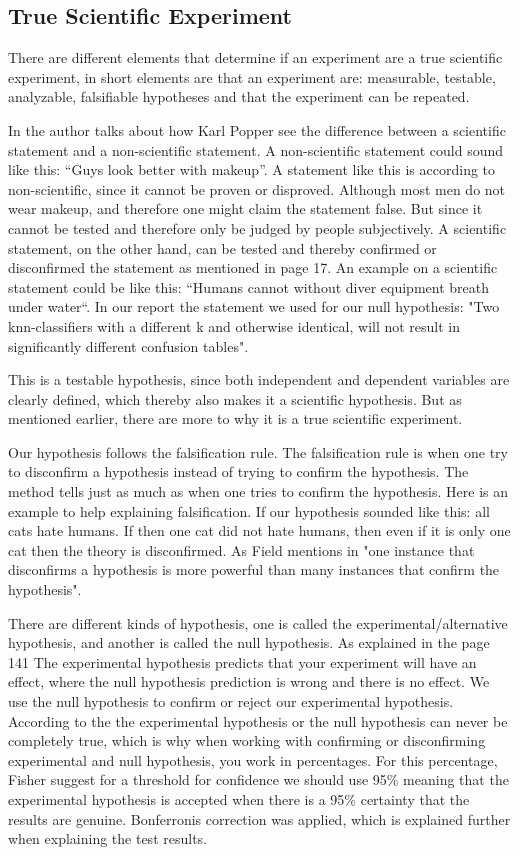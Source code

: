 \subsection{True Scientific Experiment}
There are different elements that determine if an experiment are a true scientific experiment, in short elements are that an experiment are: measurable, testable, analyzable, falsifiable hypotheses and that the experiment can be repeated.

In \citep{Design} the author talks about how Karl Popper see the difference between a scientific statement and a non-scientific statement. A non-scientific statement could sound like this: “Guys look better with makeup”. A statement like this is according to \citep{Design} non-scientific, since it cannot be proven or disproved. Although most men do not wear makeup, and therefore one might claim the statement false. But since it cannot be tested and therefore only be judged by people subjectively. 
A scientific statement, on the other hand, can be tested and thereby confirmed or disconfirmed the statement as mentioned in \citep{Design} page 17. An example on a scientific statement could be like this: “Humans cannot without diver equipment breath under water“.
In our report the statement we used for our null hypothesis: "Two knn-classifiers with a different k and otherwise identical, will not result in significantly different confusion tables". 

This is a testable hypothesis, since both independent and dependent variables are clearly defined, which thereby also makes it a scientific hypothesis. But as mentioned earlier, there are more to why it is a true scientific experiment. 


Our hypothesis follows the falsification rule.
The falsification rule is when one try to disconfirm a hypothesis instead of trying to confirm the hypothesis. The method tells just as much as when one tries to confirm the hypothesis. Here is an example to help explaining  falsification. If our hypothesis sounded like this: all cats hate humans. If then one cat did not hate humans, then even if it is only one cat then the theory is disconfirmed. As Field mentions in \citep{Design} "one instance that disconfirms a hypothesis is more powerful than many instances that confirm the hypothesis".

There are different kinds of hypothesis, one is called the experimental/alternative hypothesis, and another is called the null hypothesis. As explained in the \citep{Design} page 141 The experimental hypothesis predicts that your experiment will have an effect, where the null hypothesis prediction is wrong and there is no effect.
We use the null hypothesis to confirm or reject our experimental hypothesis. According to the \citep{Design} the experimental hypothesis or the null hypothesis can never be completely true, which is why when working with confirming or disconfirming experimental and null hypothesis, you work in percentages. For this percentage, Fisher suggest for a threshold for confidence we should use 95\% meaning that the experimental hypothesis is accepted when there is a 95\% certainty that the results are genuine. Bonferronis correction was applied, which is explained further when explaining the test results. 

